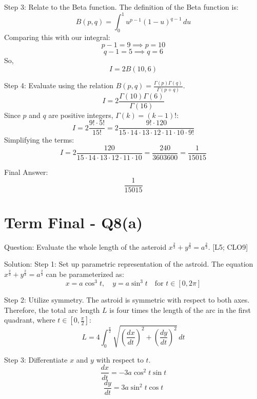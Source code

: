 \documentclass[11pt, a4paper]{article}
\begin{document}
Step 3: Relate to the Beta function.
The definition of the Beta function is:
\[
B(p, q) = \int_{0}^{1} u^{p-1} (1-u)^{q-1} \, du
\]
Comparing this with our integral:
\[
p - 1 = 9 \implies p = 10
\]
\[
q - 1 = 5 \implies q = 6
\]
So,
\[
I = 2 B(10, 6)
\]

Step 4: Evaluate using the relation $B(p, q) = \frac{\Gamma(p)\Gamma(q)}{\Gamma(p+q)}$.
\[
I = 2 \frac{\Gamma(10)\Gamma(6)}{\Gamma(16)}
\]
Since $p$ and $q$ are positive integers, $\Gamma(k) = (k-1)!$:
\[
I = 2 \frac{9! \cdot 5!}{15!} = 2 \frac{9! \cdot 120}{15 \cdot 14 \cdot 13 \cdot 12 \cdot 11 \cdot 10 \cdot 9!}
\]
Simplifying the terms:
\[
I = 2 \frac{120}{15 \cdot 14 \cdot 13 \cdot 12 \cdot 11 \cdot 10} = \frac{240}{3603600} = \frac{1}{15015}
\]

Final Answer:
\[
\boxed{\frac{1}{15015}}
\]





\section*{Term Final - Q8(a)}

Question:
Evaluate the whole length of the asteroid $x^{\frac{2}{3}} + y^{\frac{2}{3}} = a^{\frac{2}{3}}$. [L5; CLO9]

Solution:
Step 1: Set up parametric representation of the astroid.
The equation $x^{\frac{2}{3}} + y^{\frac{2}{3}} = a^{\frac{2}{3}}$ can be parameterized as:
\[
x = a \cos^3 t, \quad y = a \sin^3 t \quad \text{for } t \in [0, 2\pi]
\]

Step 2: Utilize symmetry.
The astroid is symmetric with respect to both axes. Therefore, the total arc length $L$ is four times the length of the arc in the first quadrant, where $t \in [0, \frac{\pi}{2}]$:
\[
L = 4 \int_{0}^{\frac{\pi}{2}} \sqrt{\left(\frac{dx}{dt}\right)^2 + \left(\frac{dy}{dt}\right)^2} \, dt
\]

Step 3: Differentiate $x$ and $y$ with respect to $t$.
\[
\frac{dx}{dt} = -3a \cos^2 t \sin t
\]
\[
\frac{dy}{dt} = 3a \sin^2 t \cos t
\]
\end{document}
